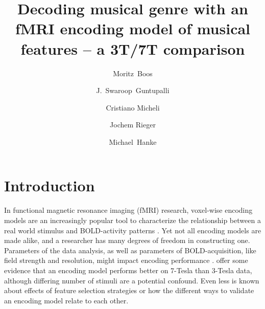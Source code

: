 



\title{Decoding musical genre with an fMRI encoding model of musical
features -- a 3T/7T comparison}


\author[1]{Moritz~Boos}
\author[2]{J.~Swaroop~Guntupalli}
\author[1]{Cristiano Micheli}
\author[1]{Jochem Rieger}
\author[3,4]{Michael~Hanke}

\maketitle
\thispagestyle{fancy}

\listoftodos

\begin{abstract}

\end{abstract}

\clearpage


\section*{Introduction}

In functional magnetic resonance imaging (f{MRI}) research, voxel-wise encoding
models are an increasingly popular tool to characterize the
relationship between a real world stimulus and BOLD-activity patterns
\citep{NG11,TD+06,KG+08,SZ09}.
Yet not all encoding models are made alike, and a researcher has many degrees
of freedom in constructing one.
Parameters of the data analysis, as well as parameters of BOLD-acquisition, like field strength and resolution,
might impact encoding performance \citep{KB07,FK12}. \citet{SF14} offer some evidence that an
encoding model performs better on 7-Tesla than 3-Tesla data, although differing
number of stimuli are a potential confound.
Even less is known about effects of feature selection strategies or how
the different ways to validate an encoding model relate to each other. 

